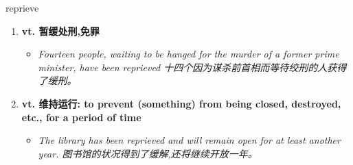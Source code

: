 
\begin{frame}
{\huge reprieve}
\begin{center}
\begin{enumerate}\Large
  \item \textbf{vt. 暂缓处刑,免罪}
  \begin{itemize}
    \item \em{\Large{Fourteen people, waiting to be hanged for the murder of a former prime minister, have been reprieved 十四个因为谋杀前首相而等待绞刑的人获得了缓刑。}}
  \end{itemize}
  \item \textbf{vt. 维持运行: to prevent (something) from being closed, destroyed, etc., for a period of time}
  \begin{itemize}
    \item \em{\Large{The library has been reprieved and will remain open for at least another year. 图书馆的状况得到了缓解,还将继续开放一年。}}
  \end{itemize}
\end{enumerate}
\end{center}
\end{frame}
